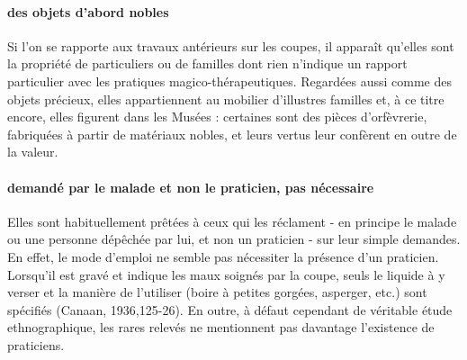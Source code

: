 \paragraph{des objets d'abord nobles}
Si l'on se rapporte aux travaux antérieurs sur les coupes, il apparaît qu'elles sont la propriété de particuliers ou de familles dont rien n'indique un rapport particulier avec les pratiques magico-thérapeutiques. Regardées aussi comme des objets précieux, elles appartiennent au mobilier d'illustres familles et, à ce titre encore, elles figurent dans les Musées : certaines 
sont des pièces d'orfèvrerie, fabriquées à partir de matériaux nobles, et leurs vertus leur confèrent en outre de la valeur. 

\paragraph{demandé par le malade et non le praticien, pas nécessaire}
Elles sont habituellement prêtées à ceux qui les réclament - en principe le malade ou une personne dépêchée par lui, et non un praticien - sur leur simple demandes. En effet, le mode d'emploi ne semble pas nécessiter la présence d'un praticien. Lorsqu'il est gravé et indique les maux soignés par la coupe, seuls le liquide à y verser et la manière de l'utiliser (boire à petites gorgées, asperger, etc.) sont spécifiés (Canaan, 1936,125-26). En outre, à défaut cependant de véritable étude ethnographique, les rares relevés ne mentionnent pas davantage l'existence de praticiens. 

